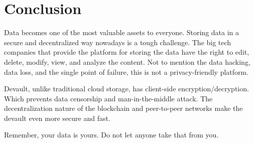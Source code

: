 \section{Conclusion}


Data becomes one of the most valuable assets to everyone. Storing data in a secure and decentralized way nowadays is a tough challenge.
The big tech companies that provide the platform for storing the data have the right to edit, delete, modify, view, and analyze the content. Not to mention the data hacking, data loss, and the single point of failure, this is not a privacy-friendly platform.

Devault, unlike traditional cloud storage, has client-side encryption/decryption. Which prevents data censorship and man-in-the-middle attack. The decentralization nature of the blockchain and peer-to-peer networks make the devault even more secure and fast.

Remember, your data is yours. Do not let anyone take that from you.